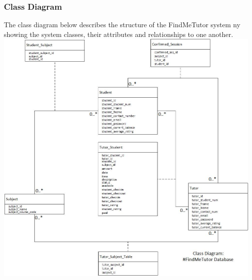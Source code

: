 \documentclass[12pt]{article}
\begin{document}
\subsubsection{Class Diagram}
The class diagram below describes the structure of the FindMeTutor system ny showing the system classes, their attributes and relationships to one another.\\
\includegraphics[width=140mm]{./class_diagram_findme_tutor.jpg}
\end{document}
